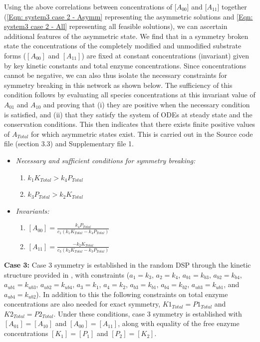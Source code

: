 \documentclass[9pt,lineno]{elife}
\begin{document}
\begin{appendixbox}
Using the above correlations between concentrations of [$A_{00}$] and [$A_{11}$] together (\cref{Eqn: system3 case 2 - Asymm} representing the asymmetric solutions and \cref{Eqn: system3 case 2 - All} representing all feasible solutions), we can ascertain additional features of the asymmetric state. We find that in a symmetry broken state the concentrations of the completely modified and unmodified substrate forms ($[A_{00}]$ and $[A_{11}]$) are fixed at constant concentrations (invariant) given by key kinetic constants and total enzyme concentrations. Since concentrations cannot be negative, we can also thus isolate the necessary constraints for symmetry breaking in this network as shown below. The sufficiency of this condition follows by evaluating all species concentrations at this invariant value of $A_{01}$ and $A_{10}$ and proving that (i) they are positive when the necessary condition is satisfied, and (ii) that they satisfy the system of ODEs at steady state and the conservation conditions. This then indicates that there exists finite positive values of $A_{Total}$ for which asymmetric states exist. This is carried out in the Source code file (section 3.3) and Supplementary file 1.

\begin{itemize}
    \item \textit{Necessary and sufficient conditions for symmetry breaking:}
    \begin{enumerate}
        \item $k_1K_{Total} > k_4P_{Total}$
        \item $k_3P_{Total} > k_2K_{Total}$
    \end{enumerate}
    \item \textit{Invariants:} 
    \begin{enumerate}
        \item $[A_{00}] = \frac{k_4P_{Total}}{c_1(k_1K_{Total}-k_4P_{Total})}$
        \item $[A_{11}] = \frac{-k_2K_{Total}}{c_3(k_2K_{Total}-k_3P_{Total})}$
    \end{enumerate} 
\end{itemize}

\textbf{Case 3:} Case 3 symmetry is established in the random DSP through the kinetic structure provided in , with constraints ($a_1 = k_3$, $a_2 = k_4$, $a_{b1} = k_{b3}$, $a_{b2} = k_{b4}$, $a_{ub1} = k_{ub3}$, $a_{ub2} = k_{ub4}$, $a_3 = k_1$, $a_4 = k_2$, $a_{b3} = k_{b1}$, $a_{b4} = k_{b2}$, $a_{ub3} = k_{ub1}$, and $a_{ub4} = k_{ub2}$). In addition to this the following constraints on total enzyme concentrations are also needed for exact symmetry, $K1_{Total} = P1_{Total}$ and $K2_{Total} = P2_{Total}$. Under these conditions, case 3 symmetry is established with $[A_{01}]=[A_{10}]$  and $[A_{00}]=[A_{11}]$, along with equality of  the free enzyme concentrations $[K_1]=[P_1]$ and $[P_2] = [K_2]$.


\end{appendixbox}
\end{document}
